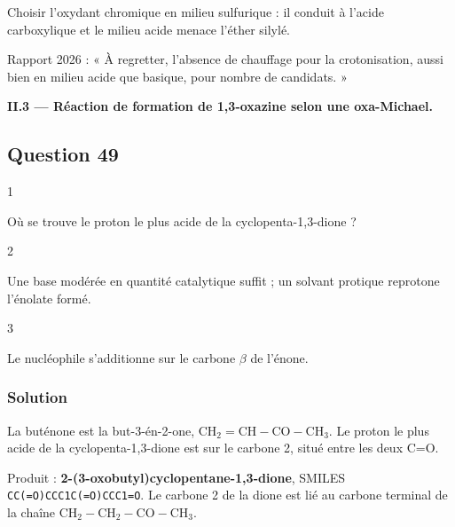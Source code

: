 \documentclass[11pt,a4paper]{article}
\begin{document}
\begin{piege}

Choisir l'oxydant chromique en milieu sulfurique : il conduit à l'acide carboxylique et le milieu acide menace l'éther silylé.

\end{piege}

\begin{jury}

Rapport 2026 : « À regretter, l'absence de chauffage pour la crotonisation, aussi bien en milieu acide que basique, pour nombre de candidats. »

\end{jury}

\textbf{II.3 --- Réaction de formation de 1,3-oxazine selon une oxa-Michael.}

\hypertarget{question-49}{%
\subsection{Question 49}\label{question-49}}

\begin{indication}{1}

Où se trouve le proton le plus acide de la cyclopenta-1,3-dione ?

\end{indication}

\begin{indication}{2}

Une base modérée en quantité catalytique suffit ; un solvant protique reprotone l'énolate formé.

\end{indication}

\begin{indication}{3}

Le nucléophile s'additionne sur le carbone \(\beta\) de l'énone.

\end{indication}

\hypertarget{solution-48}{%
\subsubsection{Solution}\label{solution-48}}

La buténone est la but-3-én-2-one, \(\mathrm{CH_2{=}CH{-}CO{-}CH_3}\). Le proton le plus acide de la cyclopenta-1,3-dione est sur le carbone 2, situé entre les deux C=O.

Produit : \textbf{2-\allowbreak{}(3-\allowbreak{}oxobutyl)cyclopentane-\allowbreak{}1,3-\allowbreak{}dione}, SMILES \texttt{CC(\allowbreak{}=\allowbreak{}O)\allowbreak{}CCC1C(\allowbreak{}=\allowbreak{}O)\allowbreak{}CCC1=\allowbreak{}O}. Le carbone 2 de la dione est lié au carbone terminal de la chaîne \(\mathrm{CH_2{-}CH_2{-}CO{-}CH_3}\).
\end{document}
